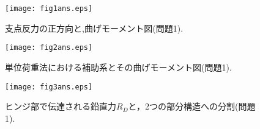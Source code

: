 \documentclass[10pt,a4j]{jarticle}
\begin{document}
\begin{figure}[h]
	\begin{center}
	\texttt{[image: fig1ans.eps]} 
	\end{center}
	\caption{支点反力の正方向と,曲げモーメント図(問題1).}
	\label{fig:fig1}
\end{figure}
\begin{figure}[h]
	\begin{center}
	\texttt{[image: fig2ans.eps]} 
	\end{center}
	\caption{単位荷重法における補助系とその曲げモーメント図(問題1).}
	\label{fig:fig2}
\end{figure}
\begin{figure}
	\begin{center}
	\texttt{[image: fig3ans.eps]} 
	\end{center}
	\caption{ヒンジ部で伝達される鉛直力$R_D$と，2つの部分構造への分割(問題1).}
	\label{fig:fig3}
\end{figure}
\end{document}
